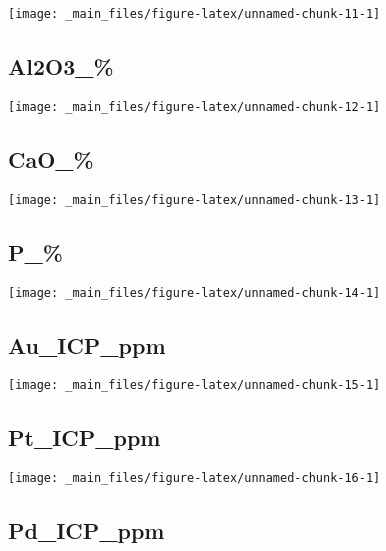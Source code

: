 \documentclass[
]{article}
\begin{document}
\begin{center}\texttt{[image: \_main\_files/figure-latex/unnamed-chunk-11-1]} \end{center}

\hypertarget{al2o3_}{%
\subsection{Al2O3\_\%}\label{al2o3_}}

\begin{center}\texttt{[image: \_main\_files/figure-latex/unnamed-chunk-12-1]} \end{center}

\hypertarget{cao_}{%
\subsection{CaO\_\%}\label{cao_}}

\begin{center}\texttt{[image: \_main\_files/figure-latex/unnamed-chunk-13-1]} \end{center}

\hypertarget{p_}{%
\subsection{P\_\%}\label{p_}}

\begin{center}\texttt{[image: \_main\_files/figure-latex/unnamed-chunk-14-1]} \end{center}

\hypertarget{au_icp_ppm}{%
\subsection{Au\_ICP\_ppm}\label{au_icp_ppm}}

\begin{center}\texttt{[image: \_main\_files/figure-latex/unnamed-chunk-15-1]} \end{center}

\hypertarget{pt_icp_ppm}{%
\subsection{Pt\_ICP\_ppm}\label{pt_icp_ppm}}

\begin{center}\texttt{[image: \_main\_files/figure-latex/unnamed-chunk-16-1]} \end{center}

\hypertarget{pd_icp_ppm}{%
\subsection{Pd\_ICP\_ppm}\label{pd_icp_ppm}}
\end{document}
